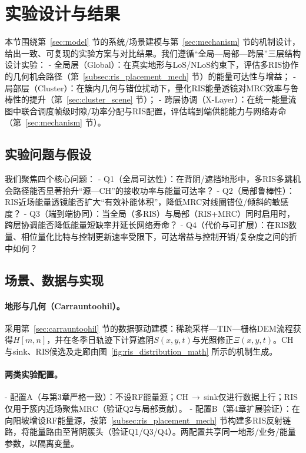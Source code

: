 \section{实验设计与结果}\label{sec:experiments}
本节围绕第~\ref{sec:model} 节的系统/场景建模与第~\ref{sec:mechanism} 节的机制设计，给出一致、可复现的实验方案与对比结果。我们遵循“全局—局部—跨层”三层结构设计实验：
- 全局层（Global）：在真实地形与LoS/NLoS约束下，评估多RIS协作的几何机会路径（第~\ref{subsec:ris_placement_mech} 节）的能量可达性与增益；
- 局部层（Cluster）：在簇内几何与错位扰动下，量化RIS能量透镜对MRC效率与鲁棒性的提升（第~\ref{sec:cluster_scene} 节）；
- 跨层协调（X-Layer）：在统一能量流图中联合调度帧级时隙/功率分配与RIS配置，评估端到端供能能力与网络寿命（第~\ref{sec:mechanism} 节）。

\subsection{实验问题与假设}
我们聚焦四个核心问题：
- Q1（全局可达性）：在背阴/遮挡地形中，多RIS多跳机会路径能否显著抬升“源—CH”的接收功率与能量可达率？
- Q2（局部鲁棒性）：RIS近场能量透镜能否扩大“有效补能体积”，降低MRC对线圈错位/倾斜的敏感度？
- Q3（端到端协同）：当全局（多RIS）与局部（RIS+MRC）同时启用时，跨层协调能否降低能量短缺率并延长网络寿命？
- Q4（代价与可扩展）：在RIS数量、相位量化比特与控制更新速率受限下，可达增益与控制开销/复杂度之间的折中如何？

\subsection{场景、数据与实现}
\paragraph{地形与几何（Carrauntoohil）。} 采用第~\ref{sec:carrauntoohil} 节的数据驱动建模：稀疏采样—TIN—栅格DEM流程获得$H[m,n]$，并在冬季日轨迹下计算遮阴$S(x,y,t)$与光照修正$\Xi(x,y,t)$。CH与sink、RIS候选及走廊由图~\ref{fig:ris_distribution_math} 所示的机制生成。

\paragraph{两类实验配置。}
- 配置A（与第3章严格一致）：不设RF能量源；CH\,$\to$\,sink仅进行数据上行；RIS仅用于簇内近场聚焦MRC（验证Q2与局部贡献）。
- 配置B（第4章扩展验证）：在向阳坡增设RF能量源，按第~\ref{subsec:ris_placement_mech} 节构建多RIS反射链路，将能量路由至背阴簇头（验证Q1/Q3/Q4）。两配置共享同一地形/业务/能量参数，以隔离变量。


